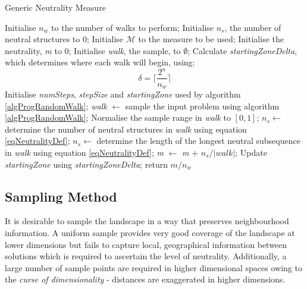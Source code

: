 \documentclass[conference]{IEEEtran}
\begin{document}
\begin{algorithm}[!t]
	\caption{Generic Neutrality Measure}
	\label{algNeutralityMeasure}
	\begin{algorithmic}
		\STATE Initialise $n_w$ to the number of walks to perform;
		\STATE Initialise $n_s$, the number of neutral structures to 0;
		\STATE Initialise $\mathcal{M}$ to the measure to be used;
		\STATE Initialise the neutrality, \textit{m} to 0;
		\STATE Initialise \textit{walk}, the sample, to $\emptyset$;
		\STATE Calculate \textit{startingZoneDelta}, which determines where each walk will begin, using:
		\begin{equation}
			\label{eqStartingZoneDelta}
			\delta = \biggr\lceil \frac{2^n}{n_w} \biggr\rceil
		\end{equation}
		\STATE Initialise \textit{numSteps}, \textit{stepSize} and \textit{startingZone} used by algorithm \ref{algProgRandomWalk};
			\STATE \textit{walk} $\gets$ sample the input problem using algorithm \ref{algProgRandomWalk};
			\STATE Normalise the sample range in \textit{walk} to $[0,1]$;
				\STATE $n_s \gets$ determine the number of neutral structures in \textit{walk} using equation \ref{eqNeutralityDef};
			\ELSE
				\STATE $n_s \gets$ determine the length of the longest neutral subsequence in \textit{walk} using equation \ref{eqNeutralityDef};		
			\ENDIF
			\STATE \textit{m} $\gets$ \textit{m} + $n_s/\lvert\textit{walk}\rvert$;	
			\STATE Update \textit{startingZone} using \textit{startingZoneDelta};
		\ENDFOR
		\STATE return $\textit{m}/n_w$
	\end{algorithmic}
\end{algorithm}

\subsection{Sampling Method}
\label{sampling}

It is desirable to sample the landscape in a way that preserves neighbourhood information. A uniform sample provides very good coverage of the landscape at lower dimensions but fails to capture local, geographical information between solutions which is required to ascertain the level of neutrality. Additionally, a large number of sample points are required in higher dimensional spaces owing to the \textit{curse of dimensionality} - distances are exaggerated in higher dimensions. 
\end{document}
